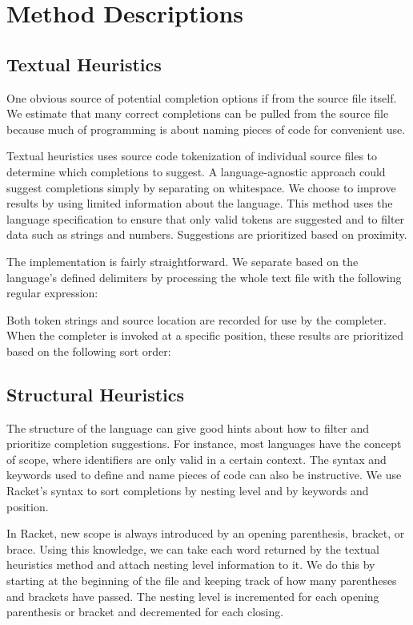 \documentclass[ms,electronic,twosidetoc,letterpaper,chaptercenter,parttop,lol,lof,lot]{byumsphd}
\begin{document}
\section{Method Descriptions}

\subsection{Textual Heuristics}

One obvious source of potential completion options if from the source file itself.
We estimate that many correct completions can be pulled from the source file because much of programming is about naming pieces of code for convenient use.

Textual heuristics uses source code tokenization of individual source files to determine which completions to suggest.
A language-agnostic approach could suggest completions simply by separating on whitespace.
We choose to improve results by using limited information about the language.
This method uses the language specification to ensure that only valid tokens are suggested and to filter data such as strings and numbers.
Suggestions are prioritized based on proximity.

The implementation is fairly straightforward.
We separate based on the language's defined delimiters by processing the whole text file with the following regular expression: \scheme{[^\s()[]",'`#|\;]+}

Both token strings and source location are recorded for use by the completer.
When the completer is invoked at a specific position, these results are prioritized based on the following sort order:


\subsection{Structural Heuristics}

The structure of the language can give good hints about how to filter and prioritize completion suggestions.
For instance, most languages have the concept of scope, where identifiers are only valid in a certain context.
The syntax and keywords used to define and name pieces of code can also be instructive.
We use Racket's syntax to sort completions by nesting level and by keywords and position.

In Racket, new scope is always introduced by an opening parenthesis, bracket, or brace.
Using this knowledge, we can take each word returned by the textual heuristics method and attach nesting level information to it.
We do this by starting at the beginning of the file and keeping track of how many parentheses and brackets have passed.
The nesting level is incremented for each opening parenthesis or bracket and decremented for each closing.
\end{document}
